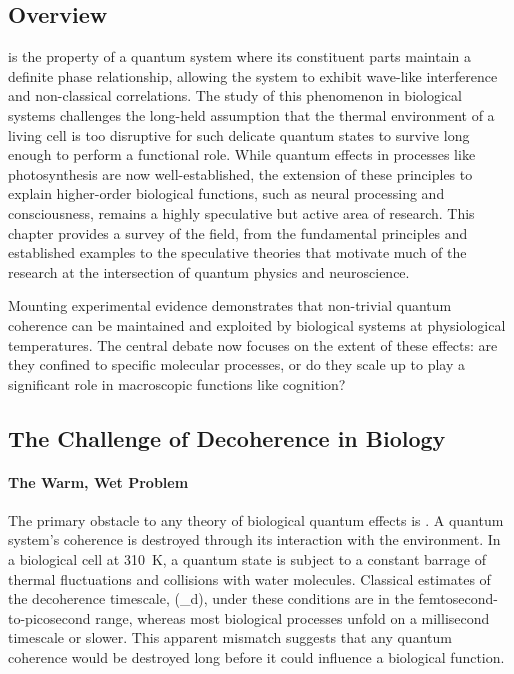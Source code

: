 \subsection{Overview}
 is the property of a quantum system where its constituent parts maintain a definite phase relationship, allowing the system to exhibit wave-like interference and non-classical correlations. The study of this phenomenon in biological systems challenges the long-held assumption that the thermal environment of a living cell is too disruptive for such delicate quantum states to survive long enough to perform a functional role.
While quantum effects in processes like photosynthesis are now well-established, the extension of these principles to explain higher-order biological functions, such as neural processing and consciousness, remains a highly speculative but active area of research. This chapter provides a survey of the field, from the fundamental principles and established examples to the speculative theories that motivate much of the research at the intersection of quantum physics and neuroscience.
\begin{keyconcept}
Mounting experimental evidence demonstrates that non-trivial quantum coherence can be maintained and exploited by biological systems at physiological temperatures. The central debate now focuses on the extent of these effects: are they confined to specific molecular processes, or do they scale up to play a significant role in macroscopic functions like cognition?
\end{keyconcept}
\subsection{The Challenge of Decoherence in Biology}
\paragraph{The Warm, Wet Problem}
The primary obstacle to any theory of biological quantum effects is . A quantum system's coherence is destroyed through its interaction with the environment. In a biological cell at 310~K, a quantum state is subject to a constant barrage of thermal fluctuations and collisions with water molecules. Classical estimates of the decoherence timescale, (\tau_d), under these conditions are in the femtosecond-to-picosecond range, whereas most biological processes unfold on a millisecond timescale or slower. This apparent mismatch suggests that any quantum coherence would be destroyed long before it could influence a biological function.
